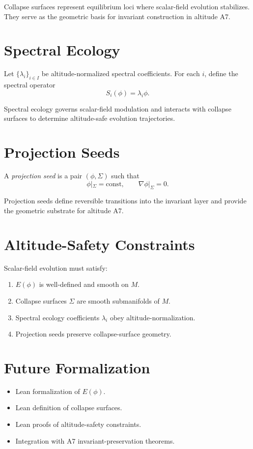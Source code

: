 \documentclass[12pt]{article}
\begin{document}
\begin{remark}
Collapse surfaces represent equilibrium loci where scalar-field evolution
stabilizes. They serve as the geometric basis for invariant construction in
altitude A7.
\end{remark}

\section{Spectral Ecology}

\begin{definition}
Let $\{ \lambda_i \}_{i \in I}$ be altitude-normalized spectral coefficients.
For each $i$, define the spectral operator
\[
S_i(\phi) = \lambda_i \phi.
\]
\end{definition}

\begin{remark}
Spectral ecology governs scalar-field modulation and interacts with collapse
surfaces to determine altitude-safe evolution trajectories.
\end{remark}

\section{Projection Seeds}

\begin{definition}
A \emph{projection seed} is a pair $(\phi, \Sigma)$ such that
\[
\phi|_{\Sigma} = \text{const}, \qquad \nabla \phi|_{\Sigma} = 0.
\]
\end{definition}

\begin{remark}
Projection seeds define reversible transitions into the invariant layer and
provide the geometric substrate for altitude A7.
\end{remark}

\section{Altitude-Safety Constraints}

\begin{definition}
Scalar-field evolution must satisfy:
\begin{enumerate}
    \item $E(\phi)$ is well-defined and smooth on $M$.
    \item Collapse surfaces $\Sigma$ are smooth submanifolds of $M$.
    \item Spectral ecology coefficients $\lambda_i$ obey altitude-normalization.
    \item Projection seeds preserve collapse-surface geometry.
\end{enumerate}
\end{definition}

\section{Future Formalization}

\begin{itemize}
    \item Lean formalization of $E(\phi)$.
    \item Lean definition of collapse surfaces.
    \item Lean proofs of altitude-safety constraints.
    \item Integration with A7 invariant-preservation theorems.
\end{itemize}
\end{document}
